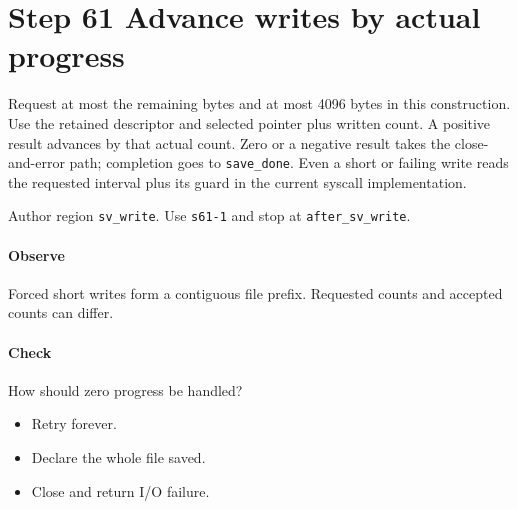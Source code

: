 \section{Step 61 Advance writes by actual progress}\label{pcm-wav-s61}
Request at most the remaining bytes and at most 4096 bytes in this construction. Use the retained descriptor and selected pointer plus written count. A positive result advances by that actual count. Zero or a negative result takes the close-and-error path; completion goes to \texttt{save\_done}. Even a short or failing write reads the requested interval plus its guard in the current syscall implementation.

Author region \texttt{sv\_write}. Use \texttt{s61-1} and stop at \texttt{after\_sv\_write}.

\paragraph{Observe} Forced short writes form a contiguous file prefix. Requested counts and accepted counts can differ.

\paragraph{Check} How should zero progress be handled?
\begin{itemize}
  \item[A.] Retry forever.
  \item[B.] Declare the whole file saved.
  \item[C.] Close and return I/O failure.
\end{itemize}
